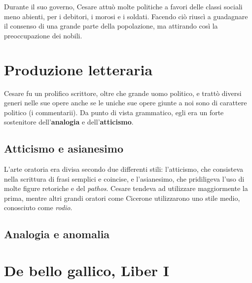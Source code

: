 \documentclass[10pt,a4paper]{article}
\begin{document}
Durante il suo governo, Cesare attuò molte politiche a favori delle classi sociali meno abienti, per i debitori, i morosi e i soldati. Facendo ciò riuscì a guadagnare il consenso di una grande parte della popolazione, ma attirando così la preoccupazione dei nobili.

\section{Produzione letteraria}

Cesare fu un prolifico scrittore, oltre che grande uomo politico, e trattò diversi generi nelle sue opere anche se le uniche sue opere giunte a noi sono di carattere politico (i commentarii). Da punto di vista grammatico, egli era un forte sostenitore dell'\textbf{analogia} e dell'\textbf{atticismo}.

\subsection{Atticismo e asianesimo}

L'arte oratoria era divisa secondo due differenti stili: l'atticismo, che consisteva nella scrittura di frasi semplici e coincise, e l'asianesimo, che pridiligeva l'uso di molte figure retoriche e del \textit{pathos}. Cesare tendeva ad utilizzare maggiormente la prima, mentre altri grandi oratori come Cicerone utilizzarono uno stile medio, conosciuto come \textit{rodio}.

\subsection{Analogia e anomalia}



	\section{De bello gallico, Liber I}
\end{document}

